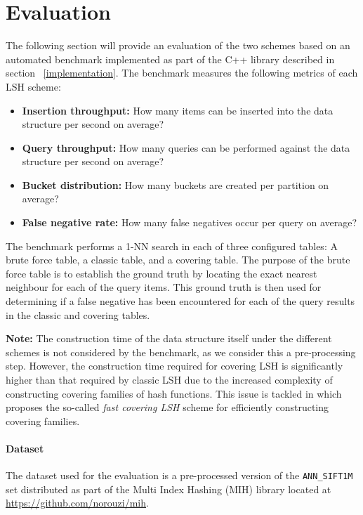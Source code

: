 \section{Evaluation}
\label{evaluation}

The following section will provide an evaluation of the two schemes based on an automated benchmark implemented as part of the C++ library described in section ~\ref{implementation}. The benchmark measures the following metrics of each LSH scheme:

\begin{itemize}
  \item \textbf{Insertion throughput:} How many items can be inserted into the data structure per second on average?
  \item \textbf{Query throughput:} How many queries can be performed against the data structure per second on average?
  \item \textbf{Bucket distribution:} How many buckets are created per partition on average?
  \item \textbf{False negative rate:} How many false negatives occur per query on average?
\end{itemize}

The benchmark performs a 1-NN search in each of three configured tables: A brute force table, a classic table, and a covering table. The purpose of the brute force table is to establish the ground truth by locating the exact nearest neighbour for each of the query items. This ground truth is then used for determining if a false negative has been encountered for each of the query results in the classic and covering tables.

\textbf{Note:} The construction time of the data structure itself under the different schemes is not considered by the benchmark, as we consider this a pre-processing step. However, the construction time required for covering LSH is significantly higher than that required by classic LSH due to the increased complexity of constructing covering families of hash functions. This issue is tackled in \cite{DBLP:journals/corr/PhamP16} which proposes the so-called \textit{fast covering LSH} scheme for efficiently constructing covering families.

\paragraph{Dataset} The dataset used for the evaluation is a pre-processed version of the \texttt{ANN\_SIFT1M} set distributed as part of the Multi Index Hashing (MIH) library located at \url{https://github.com/norouzi/mih}.


